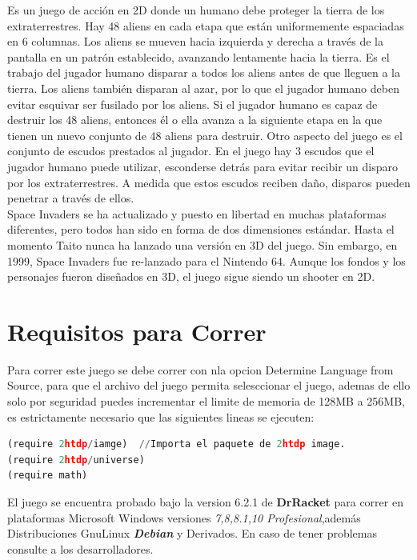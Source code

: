 \documentclass[a4paper]{article}
\begin{document}
Es un juego de acción en 2D donde un humano debe proteger la tierra de los extraterrestres. Hay 48 aliens en cada etapa que están uniformemente espaciadas en 6 columnas. Los aliens se mueven hacia izquierda y derecha a través de la pantalla en un patrón establecido, avanzando lentamente hacia la tierra. Es el trabajo del jugador humano disparar a todos los aliens antes de que lleguen a la tierra. Los aliens también disparan al azar, por lo que el jugador humano deben evitar esquivar ser fusilado por los aliens. Si el jugador humano es capaz de destruir los 48 aliens, entonces él o ella avanza a la siguiente etapa en la que tienen un nuevo conjunto de 48 aliens para destruir. Otro aspecto del juego es el conjunto de escudos prestados al jugador. En el juego hay 3 escudos que el jugador humano puede utilizar,  esconderse detrás para evitar recibir un disparo por los extraterrestres. A medida que estos escudos reciben daño, disparos pueden penetrar a través de ellos.\\

Space Invaders se ha actualizado y puesto en libertad en muchas plataformas diferentes, pero todos han sido en forma de dos dimensiones estándar. Hasta el momento Taito nunca ha lanzado una versión en 3D del juego. Sin embargo, en 1999, Space Invaders fue re-lanzado para el Nintendo 64. Aunque los fondos y los personajes fueron diseñados en 3D, el juego sigue siendo un shooter en 2D.

\section{Requisitos para Correr}
Para correr este juego se debe correr con nla opcion Determine Language from Source, para que el archivo del juego 
permita  selesccionar el juego, ademas de ello solo por seguridad puedes incrementar el limite de memoria de 128MB 
a 256MB, es estrictamente necesario que las siguientes lineas se ejecuten:
\begin{lstlisting}[language=python]
(require 2htdp/iamge)  //Importa el paquete de 2htdp image.
(require 2htdp/universe)
(require math)
\end{lstlisting}
El juego se encuentra probado bajo la version 6.2.1 de \textbf{DrRacket} para correr en plataformas Microsoft Windows versiones \textit{ 7,8,8.1,10 Profesional},además  Distribuciones Gnu\/Linux \textbf{\textit{Debian}} y Derivados.
En caso de tener problemas consulte a los desarrolladores.
\end{document}
